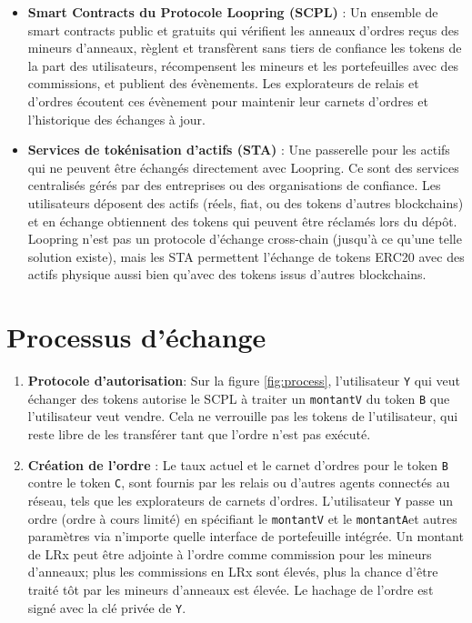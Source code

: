 \documentclass[UTF8,nofonts]{article}
\begin{document}
\begin{multicols}{2}
\begin{itemize}
\item \textbf{Smart Contracts du Protocole Loopring (SCPL)} : Un ensemble de smart contracts public et gratuits qui vérifient les anneaux d'ordres reçus des mineurs d'anneaux, règlent et transfèrent sans tiers de confiance les tokens de la part des utilisateurs, récompensent les mineurs et les portefeuilles avec des commissions, et publient des évènements. Les explorateurs de relais et d'ordres écoutent ces évènement pour maintenir leur carnets d'ordres et l'historique des échanges à jour.

\item \textbf{Services de tokénisation d'actifs (STA)} : Une passerelle pour les actifs qui ne peuvent être échangés directement avec Loopring. Ce sont des services centralisés gérés par des entreprises ou des organisations de confiance. Les utilisateurs déposent des actifs (réels, fiat, ou des tokens d'autres blockchains) et en échange obtiennent des tokens qui peuvent être réclamés lors du dépôt. Loopring n'est pas un protocole d'échange cross-chain (jusqu'à ce qu'une telle solution existe), mais les STA permettent l'échange de tokens ERC20 \cite{ERC20} avec des actifs physique aussi bien qu'avec des tokens issus d'autres blockchains. 

\end{itemize}


\section{Processus d'échange\label{sec:process}}



\begin{enumerate} 


\item \textbf{Protocole d'autorisation}: Sur la figure \ref{fig:process}, l'utilisateur \verb|Y| qui veut échanger des tokens autorise le SCPL à traiter un \verb|montantV| du token \verb|B| que l'utilisateur veut vendre. Cela ne verrouille pas les tokens de l'utilisateur, qui reste libre de les transférer tant que l'ordre n'est pas exécuté.

\item \textbf{Création de l'ordre} : Le taux actuel et le carnet d'ordres pour le token \verb|B| contre le token \verb|C|, sont fournis par les relais ou d'autres agents connectés au réseau, tels que les explorateurs de carnets d'ordres. L'utilisateur \verb|Y| passe un ordre (ordre à cours limité) en spécifiant le \verb|montantV| et le  \verb|montantA|et autres paramètres via n'importe quelle interface de portefeuille intégrée. Un montant de LRx peut être adjointe à l'ordre comme commission pour les mineurs d'anneaux; plus les commissions en LRx sont élevés, plus la chance d'être traité tôt par les mineurs d'anneaux est élevée. Le hachage de l'ordre est signé avec la clé privée de \verb|Y|.


\end{enumerate}
\end{multicols}
\end{document}
